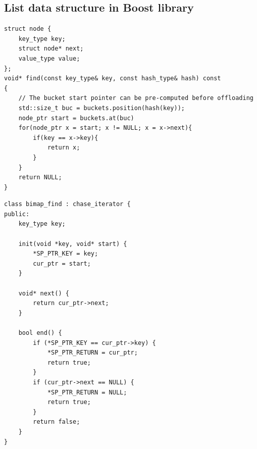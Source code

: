 \begin{minipage}{0.47\textwidth}
\subsection{List data structure in Boost library}
\centering
\begin{lstlisting}[caption={Boost realization for \code{bimap::find()}},label={lst:bimap}, captionpos=t]
struct node {
    key_type key;
    struct node* next;
    value_type value;
};
void* find(const key_type& key, const hash_type& hash) const
{
    // The bucket start pointer can be pre-computed before offloading
    std::size_t buc = buckets.position(hash(key));
    node_ptr start = buckets.at(buc)
    for(node_ptr x = start; x != NULL; x = x->next){
        if(key == x->key){
            return x;
        }
    }
    return NULL;
}
\end{lstlisting}

\begin{lstlisting}[caption={\pulse realization for \code{bimap::find()}},label={lst:bimap_mod}, captionpos=t]
class bimap_find : chase_iterator {
public:
    key_type key;
  
    init(void *key, void* start) {
        *SP_PTR_KEY = key;
        cur_ptr = start;
    }
  
    void* next() {
        return cur_ptr->next;
    }
  
    bool end() {
        if (*SP_PTR_KEY == cur_ptr->key) {
            *SP_PTR_RETURN = cur_ptr;
            return true;
        }
        if (cur_ptr->next == NULL) {
            *SP_PTR_RETURN = NULL;  
            return true;
        }
        return false;
    }
}
\end{lstlisting}
\end{minipage}

